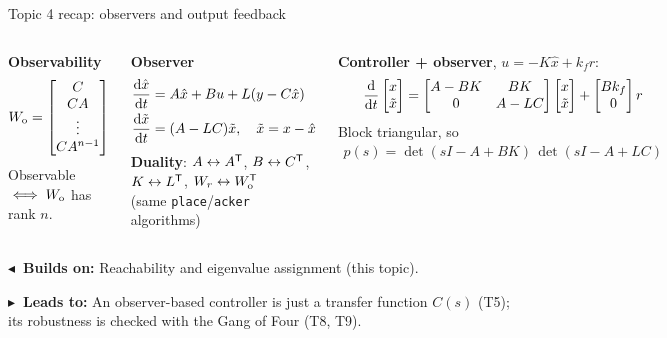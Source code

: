 \documentclass[10pt]{beamer-control}
\newcommand\LINKS[2]{%
  \par\vfill
  {\scriptsize\setlength\fboxsep{3pt}%
  \colorbox{AUHighlight!10}{\parbox{\dimexpr\linewidth-6pt\relax}{%
    \textbf{\color{AUHighlight}$\blacktriangleleft$~Builds on:} #1\par
    \textbf{\color{AUHighlight}$\blacktriangleright$~Leads to:} #2%
    \hfill\hyperlink{coursemap}{\beamerbutton{Course map}}}}}%
}
\begin{document}
\begin{frame}{Topic 4 recap: observers and output feedback}
  \begin{columns}[t]
    \footnotesize
    \textbf{Observability}
    \begin{align*}
      W_{\mathrm{o}} = \begin{bmatrix}C\\CA\\\vdots\\CA^{n-1}\end{bmatrix}
    \end{align*}
    Observable $\iff W_{\mathrm{o}}$ has rank $n$.
    \par\medskip
    \textbf{Observer}
    \begin{align*}
      \frac{\mathrm{d} \hat x}{\mathrm{d} t} &= A\hat x + Bu + L(y - C\hat x)\\
      \frac{\mathrm{d} \tilde x}{\mathrm{d} t} &= (A-LC)\tilde x, \quad \tilde x = x - \hat x
    \end{align*}
    \footnotesize
    \textbf{Duality}: $A\leftrightarrow A^{\mathsf T}$, $B\leftrightarrow C^{\mathsf T}$, $K\leftrightarrow L^{\mathsf T}$, $W_r\leftrightarrow W_{\mathrm{o}}^{\mathsf T}$\\
    (same \texttt{place}/\texttt{acker} algorithms)
    \par\medskip
    \textbf{Controller + observer}, $u = -K\hat x + k_f r$:
    \begin{align*}
      \frac{\mathrm{d} }{\mathrm{d} t}\begin{bmatrix}x\\\tilde x\end{bmatrix} = \begin{bmatrix}A-BK & BK\\ 0 & A-LC\end{bmatrix}\begin{bmatrix}x\\\tilde x\end{bmatrix} + \begin{bmatrix}Bk_f\\0\end{bmatrix}r
    \end{align*}
    Block triangular, so
    \begin{align*}
      p(s) = \det(sI-A+BK)\,\det(sI-A+LC)
    \end{align*}
  \end{columns}
  \LINKS{Reachability and eigenvalue assignment (this topic).}{An observer-based controller is just a transfer function $C(s)$ (T5); its robustness is checked with the Gang of Four (T8, T9).}
\end{frame}

\end{document}
